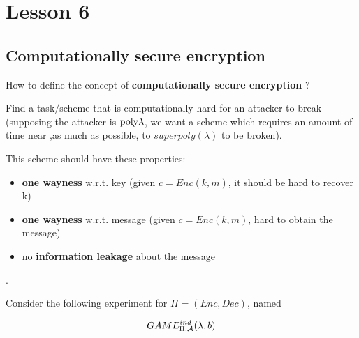 \chapter*{Lesson 6}

\section{Computationally secure encryption}

\begin{question}
    How to define the concept of \textbf{computationally secure encryption} ?    
\end{question}

Find a task/scheme that is computationally hard for an attacker to break
(supposing the attacker is $ \mathrm{poly}{\lambda} $, we want a scheme which requires
an amount of time near ,as much as possible, to $superpoly(\lambda)$ to be
broken).

This scheme should have these properties:
\begin{itemize}
    \item \label{prop:owk} \textbf{one wayness} w.r.t. key (given $c=Enc(k,m)$,
        it should be hard to recover k) 
    \item \label{prop:owm} \textbf{one wayness}  w.r.t. message (given
        $c=Enc(k,m)$, hard to obtain the message)
    \item \label{prop:nol} no \textbf{information leakage} about the message
\end{itemize}.

Consider the following experiment for $\Pi=(Enc, Dec)$, named 

\[
    GAME_{\Pi, \mathcal{A}}^{ind}(\lambda, b)
\]


\begin{figure}[h!]
   \centering
   \sdinit{}
   \label{fig:knowmess}
\end{figure}

